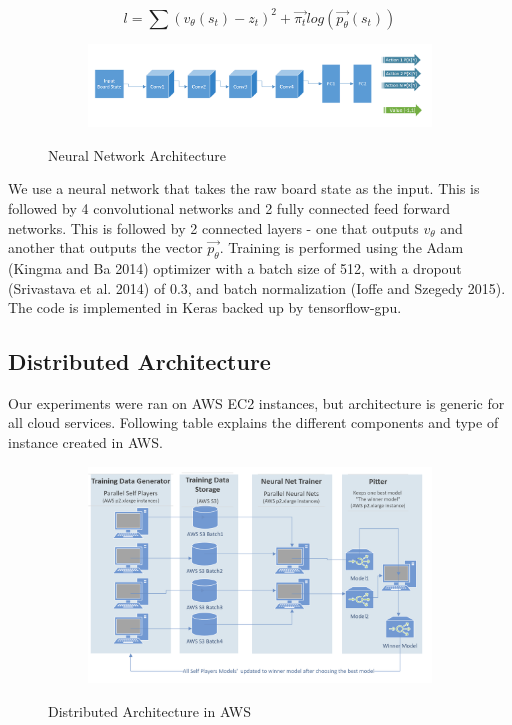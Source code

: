 \documentclass[11pt]{article}
\begin{document}
\[ l = \sum (v_{\theta}(s_{t}) - z_{t})^{2}+ \vec{\pi_{t}} log(\vec{p_{\theta}}(s_{t}))  \]

\begin{figure}[h!]
  \centering
  \begin{subfigure}[b]{1\linewidth}
    \includegraphics[width=\linewidth]{cnn.png}
  \end{subfigure}
  \caption{Neural Network Architecture}
  \label{fig:gameplay}
\end{figure}
 
  We use a neural network that takes the raw board state as the input. This is followed by 4 convolutional networks and 2 fully connected feed forward networks. This is followed by 2 connected layers - one that outputs $v_{\theta}$ and another that outputs the vector $\vec{p_{\theta}}$. Training is performed using the Adam (Kingma and Ba 2014) optimizer with a batch size of 512, with a dropout (Srivastava et al. 2014) of 0.3, and batch normalization (Ioﬀe and Szegedy 2015). The code is implemented in Keras backed up by tensorflow-gpu. 
  

\subsection{Distributed Architecture}

Our experiments were ran on AWS EC2 instances, but architecture is generic for all cloud services. 
Following table explains the different components and type of instance created in AWS. 

\begin{figure}[h!]
  \centering
  \begin{subfigure}[b]{1\linewidth}
    \includegraphics[width=\linewidth]{distributed_arch.png}
  \end{subfigure}
  \caption{Distributed Architecture in AWS}  
  \label{fig:distributed_arch}
\end{figure}
\end{document}
